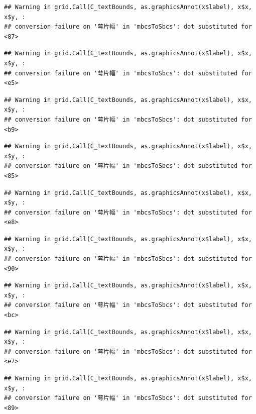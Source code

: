 \documentclass[
]{book}
\begin{document}
\begin{verbatim}
## Warning in grid.Call(C_textBounds, as.graphicsAnnot(x$label), x$x, x$y, :
## conversion failure on '萼片幅' in 'mbcsToSbcs': dot substituted for <87>
\end{verbatim}

\begin{verbatim}
## Warning in grid.Call(C_textBounds, as.graphicsAnnot(x$label), x$x, x$y, :
## conversion failure on '萼片幅' in 'mbcsToSbcs': dot substituted for <e5>
\end{verbatim}

\begin{verbatim}
## Warning in grid.Call(C_textBounds, as.graphicsAnnot(x$label), x$x, x$y, :
## conversion failure on '萼片幅' in 'mbcsToSbcs': dot substituted for <b9>
\end{verbatim}

\begin{verbatim}
## Warning in grid.Call(C_textBounds, as.graphicsAnnot(x$label), x$x, x$y, :
## conversion failure on '萼片幅' in 'mbcsToSbcs': dot substituted for <85>
\end{verbatim}

\begin{verbatim}
## Warning in grid.Call(C_textBounds, as.graphicsAnnot(x$label), x$x, x$y, :
## conversion failure on '萼片幅' in 'mbcsToSbcs': dot substituted for <e8>
\end{verbatim}

\begin{verbatim}
## Warning in grid.Call(C_textBounds, as.graphicsAnnot(x$label), x$x, x$y, :
## conversion failure on '萼片幅' in 'mbcsToSbcs': dot substituted for <90>
\end{verbatim}

\begin{verbatim}
## Warning in grid.Call(C_textBounds, as.graphicsAnnot(x$label), x$x, x$y, :
## conversion failure on '萼片幅' in 'mbcsToSbcs': dot substituted for <bc>
\end{verbatim}

\begin{verbatim}
## Warning in grid.Call(C_textBounds, as.graphicsAnnot(x$label), x$x, x$y, :
## conversion failure on '萼片幅' in 'mbcsToSbcs': dot substituted for <e7>
\end{verbatim}

\begin{verbatim}
## Warning in grid.Call(C_textBounds, as.graphicsAnnot(x$label), x$x, x$y, :
## conversion failure on '萼片幅' in 'mbcsToSbcs': dot substituted for <89>
\end{verbatim}
\end{document}
